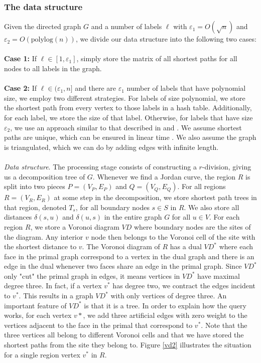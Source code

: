 \subsubsection{The data structure}
Given the directed graph $G$ and a number of labels $\ell$ with
$\varepsilon_1 = O(\sqrt{n})$ and $\varepsilon_2=O(\text{polylog}(n))$, we divide our
data structure into the following two cases: \\
\\
\textbf{Case 1:} If $\ell\in [1, \varepsilon_1]$, simply store the matrix of all shortest paths for all nodes to all
labels in the graph. \\
\\
\textbf{Case 2:} If $\ell\in (\varepsilon_1, n]$ and there are $\varepsilon_1$ number of labels that have
polynomial size, we employ two different strategies. For labels of size polynomial, we store the
shortest path from every vertex to those labels in a hash table. Additionally, for each
label, we store the size of that label. Otherwise, for labels that have size
$\varepsilon_2$, we
use an approach similar to that described in \cite{cohen2017fast} and
\cite{gawrychowski2017better}. We assume shortest paths are unique, which can be ensured
in linear time \cite{motwani2010randomized}\cite{mulmuley1987matching}. We also assume
the graph is triangulated, which we can do by adding edges with infinite length.\\
\\
\indent
\textit{Data structure}. The processing stage consists of constructing a $r$-division,
giving us a decomposition tree of $G$. Whenever we find a Jordan curve, the region $R$ is
split into two pieces $P=(V_P, E_P)$ and
$Q=(V_Q, E_Q)$. For all regions $R=(V_R, E_R)$ at some
step in the decomposition, we store shortest path trees in that region, denoted $T_s$,
for all boundary nodes $s\in S$ in $R$. We also store all distances $\delta(s,u)$ and
$\delta(u,s)$ in the entire graph $G$ for all $u\in V$. For each region $R$, we store a
Voronoi diagram $VD$ where boundary nodes are the sites of the diagram. Any interior $v$ node then
belongs to the Voronoi cell of the site with the shortest distance to $v$. The Voronoi
diagram of $R$ has a dual $VD^*$ where each face in the primal graph correspond to a
vertex in the dual graph and there is an edge in the dual whenever two faces share an
edge in the primal graph. Since $VD^*$ only "cut" the primal graph in edges, it means vertices in
$VD^*$ have maximal degree three. In fact, if a vertex $v^*$ has degree two, we contract
the edges incident to $v^*$. This results in a graph $VD^*$ with only vertices of degree
three. An important feature of $VD^*$ is that it is a tree. In order to explain how the
query works, for each vertex $v*$, we add three artificial edges with zero weight to the vertices adjacent
to the face in the primal that correspond to $v^*$. Note that the three vertices all
belong to different Voronoi cells and that we have stored the shortest paths from the site they
belong to. Figure \ref{vd2} illustrates the
situation for a single region vertex $v^*$ in $R$.

